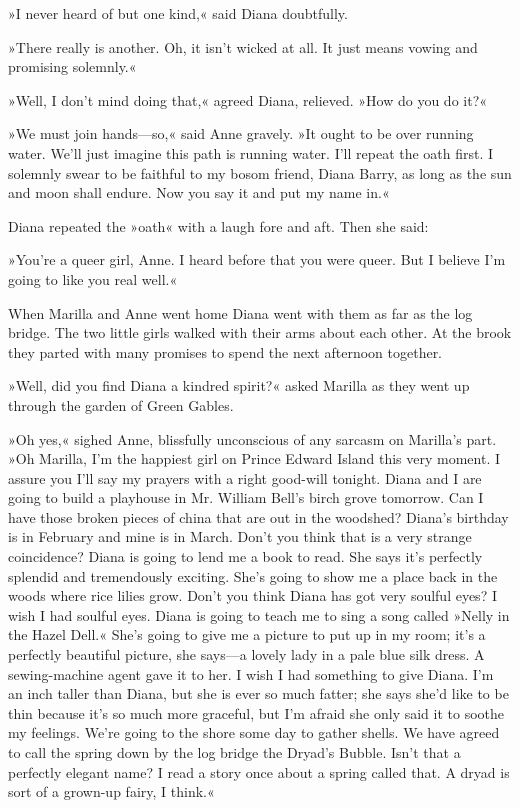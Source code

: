 »I never heard of but one kind,« said Diana doubtfully.

»There really is another. Oh, it isn't wicked at all. It just means vowing and promising solemnly.«

»Well, I don't mind doing that,« agreed Diana, relieved. »How do you do it?«

»We must join hands—so,« said Anne gravely. »It ought to be over running water. We'll just imagine this path is running water. I'll repeat the oath first. I solemnly swear to be faithful to my bosom friend, Diana Barry, as long as the sun and moon shall endure. Now you say it and put my name in.«

Diana repeated the »oath« with a laugh fore and aft. Then she said:

»You're a queer girl, Anne. I heard before that you were queer. But I believe I'm going to like you real well.«

When Marilla and Anne went home Diana went with them as far as the log bridge. The two little girls walked with their arms about each other. At the brook they parted with many promises to spend the next afternoon together.

»Well, did you find Diana a kindred spirit?« asked Marilla as they went up through the garden of Green Gables.

»Oh yes,« sighed Anne, blissfully unconscious of any sarcasm on Marilla's part. »Oh Marilla, I'm the happiest girl on Prince Edward Island this very moment. I assure you I'll say my prayers with a right good-will tonight. Diana and I are going to build a playhouse in Mr. William Bell's birch grove tomorrow. Can I have those broken pieces of china that are out in the woodshed? Diana's birthday is in February and mine is in March. Don't you think that is a very strange coincidence? Diana is going to lend me a book to read. She says it's perfectly splendid and tremendously exciting. She's going to show me a place back in the woods where rice lilies grow. Don't you think Diana has got very soulful eyes? I wish I had soulful eyes. Diana is going to teach me to sing a song called »Nelly in the Hazel Dell.« She's going to give me a picture to put up in my room; it's a perfectly beautiful picture, she says—a lovely lady in a pale blue silk dress. A sewing-machine agent gave it to her. I wish I had something to give Diana. I'm an inch taller than Diana, but she is ever so much fatter; she says she'd like to be thin because it's so much more graceful, but I'm afraid she only said it to soothe my feelings. We're going to the shore some day to gather shells. We have agreed to call the spring down by the log bridge the Dryad's Bubble. Isn't that a perfectly elegant name? I read a story once about a spring called that. A dryad is sort of a grown-up fairy, I think.«

